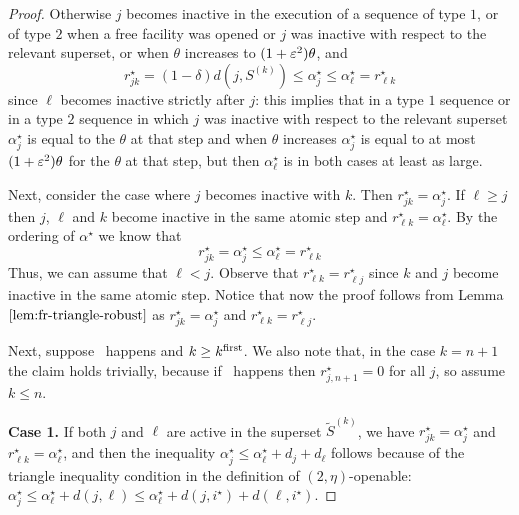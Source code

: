\begin{proof}
    Otherwise $j$ becomes inactive in the execution of a sequence of type $1$, or of type $2$ when a free facility was opened or $j$ was inactive with respect to the relevant superset, or when $\theta$ increases to $(1+\varepsilon^2)\theta$, and
    \[
        r^\star_{jk} = (1-\delta)d(j,S^{(k)}) \le \alpha^\star_j \le \alpha^\star_\ell = r^\star_{\ell k}
    \]
    since $\ell$ becomes inactive strictly after $j$: this implies that in a type $1$ sequence or in a type $2$ sequence in which $j$ was inactive with respect to the relevant superset $\alpha^\star_j$ is equal to the $\theta$ at that step and when $\theta$ increases $\alpha^\star_j$ is equal to at most $(1+\varepsilon^2)\theta$ for the $\theta$ at that step, but then $\alpha^\star_\ell$ is in both cases at least as large.
    
    Next, consider the case where $j$ becomes inactive with $k$. Then $r^\star_{jk} = \alpha^\star_j$. If $\ell \ge j$ then $j$, $\ell$ and $k$ become inactive in the same atomic step and $r^\star_{\ell k} = \alpha^\star_\ell$. By the ordering of $\alpha^\star$ we know that 
    \[
        r^\star_{jk} = \alpha^\star_j \le \alpha^\star_\ell = r^\star_{\ell k}
    \]
    Thus, we can assume that $\ell < j$. Observe that $r^\star_{\ell k} = r^\star_{\ell j}$ since $k$ and $j$ become inactive in the same atomic step. Notice that now the proof follows from Lemma $\ref{lem:fr-triangle-robust}$ as $r^\star_{jk} = \alpha^\star_{j}$ and $r^\star_{\ell k} = r^\star_{\ell j}$.

    Next, suppose \specialevent\ happens and $k \geq k^{\mathrm{first}}$.
    We also note that, in the case $k=n+1$ the claim holds trivially, because if \specialevent\ happens then $r^\star_{j,n+1} = 0$ for all $j$, so assume $k \leq n$.
    
    \textbf{Case 1.} If both $j$ and $\ell$ are active in the superset $\tilde{S}^{(k)}$, we have $r^\star_{jk} = \alpha_j^\star$ and $r^\star_{\ell k} = \alpha_\ell^\star$, and then the inequality $\alpha_j^\star \leq \alpha_\ell^\star + d_j + d_\ell$ follows because of the triangle inequality condition in the definition of $(2,\eta)$-openable: $\alpha^\star_j \leq \alpha^\star_\ell + d(j, \ell) \leq \alpha^\star_\ell + d(j, i^\star) + d(\ell, i^\star)$.
    

\end{proof}
